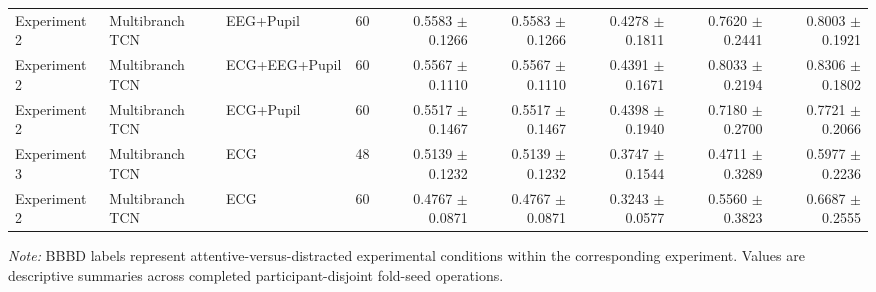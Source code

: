 \begin{table}[htbp]
{\begin{tabular}{lllrrrrrr}
Experiment 2 & Multibranch TCN & EEG+Pupil & 60 & 0.5583 $\pm$ 0.1266 & 0.5583 $\pm$ 0.1266 & 0.4278 $\pm$ 0.1811 & 0.7620 $\pm$ 0.2441 & 0.8003 $\pm$ 0.1921 \\
Experiment 2 & Multibranch TCN & ECG+EEG+Pupil & 60 & 0.5567 $\pm$ 0.1110 & 0.5567 $\pm$ 0.1110 & 0.4391 $\pm$ 0.1671 & 0.8033 $\pm$ 0.2194 & 0.8306 $\pm$ 0.1802 \\
Experiment 2 & Multibranch TCN & ECG+Pupil & 60 & 0.5517 $\pm$ 0.1467 & 0.5517 $\pm$ 0.1467 & 0.4398 $\pm$ 0.1940 & 0.7180 $\pm$ 0.2700 & 0.7721 $\pm$ 0.2066 \\
Experiment 3 & Multibranch TCN & ECG & 48 & 0.5139 $\pm$ 0.1232 & 0.5139 $\pm$ 0.1232 & 0.3747 $\pm$ 0.1544 & 0.4711 $\pm$ 0.3289 & 0.5977 $\pm$ 0.2236 \\
Experiment 2 & Multibranch TCN & ECG & 60 & 0.4767 $\pm$ 0.0871 & 0.4767 $\pm$ 0.0871 & 0.3243 $\pm$ 0.0577 & 0.5560 $\pm$ 0.3823 & 0.6687 $\pm$ 0.2555 \\
\bottomrule
\end{tabular}%
}
\par\medskip\footnotesize\textit{Note:} BBBD labels represent attentive-versus-distracted experimental conditions within the corresponding experiment. Values are descriptive summaries across completed participant-disjoint fold-seed operations.
\end{table}
